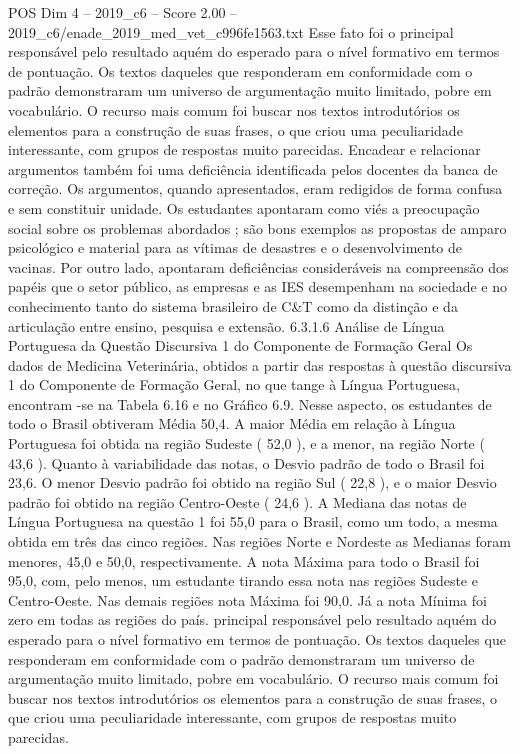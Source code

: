 \begin{textsample}{POS Dim 4 – 2019\_c6 – Score 2.00 – 2019\_c6/enade\_2019\_med\_vet\_c996fe1563.txt}
Esse fato foi o principal responsável pelo resultado aquém do esperado para o nível formativo em termos de pontuação.
Os textos daqueles que responderam em conformidade com o padrão demonstraram um universo de argumentação muito limitado, pobre em vocabulário.
O recurso mais comum foi buscar nos textos introdutórios os elementos para a construção de suas frases, o que criou uma peculiaridade interessante, com grupos de respostas muito parecidas.
Encadear e relacionar argumentos também foi uma deficiência identificada pelos docentes da banca de correção.
Os argumentos, quando apresentados, eram redigidos de forma confusa e sem constituir unidade.
Os estudantes apontaram como viés a preocupação social sobre os problemas abordados ; são bons exemplos as propostas de amparo psicológico e material para as vítimas de desastres e o desenvolvimento de vacinas.
Por outro lado, apontaram deficiências consideráveis na compreensão dos papéis que o setor público, as empresas e as IES desempenham na sociedade e no conhecimento tanto do sistema brasileiro de C\&T como da distinção e da articulação entre ensino, pesquisa e extensão. 6.3.1.6 Análise de Língua Portuguesa da Questão Discursiva 1 do Componente de Formação Geral Os dados de Medicina Veterinária, obtidos a partir das respostas à questão discursiva 1 do Componente de Formação Geral, no que tange à Língua Portuguesa, encontram -se na Tabela 6.16 e no Gráfico 6.9.
Nesse aspecto, os estudantes de todo o Brasil obtiveram Média 50,4.
A maior Média em relação à Língua Portuguesa foi obtida na região Sudeste ( 52,0 ), e a menor, na região Norte ( 43,6 ).
Quanto à variabilidade das notas, o Desvio padrão de todo o Brasil foi 23,6.
O menor Desvio padrão foi obtido na região Sul ( 22,8 ), e o maior Desvio padrão foi obtido na região Centro-Oeste ( 24,6 ).
A Mediana das notas de Língua Portuguesa na questão 1 foi 55,0 para o Brasil, como um todo, a mesma obtida em três das cinco regiões.
Nas regiões Norte e Nordeste as Medianas foram menores, 45,0 e 50,0, respectivamente.
A nota Máxima para todo o Brasil foi 95,0, com, pelo menos, um estudante tirando essa nota nas regiões Sudeste e Centro-Oeste.
Nas demais regiões nota Máxima foi 90,0.
Já a nota Mínima foi zero em todas as regiões do país. principal responsável pelo resultado aquém do esperado para o nível formativo em termos de pontuação.
Os textos daqueles que responderam em conformidade com o padrão demonstraram um universo de argumentação muito limitado, pobre em vocabulário.
O recurso mais comum foi buscar nos textos introdutórios os elementos para a construção de suas frases, o que criou uma peculiaridade interessante, com grupos de respostas muito parecidas.

\end{textsample}
